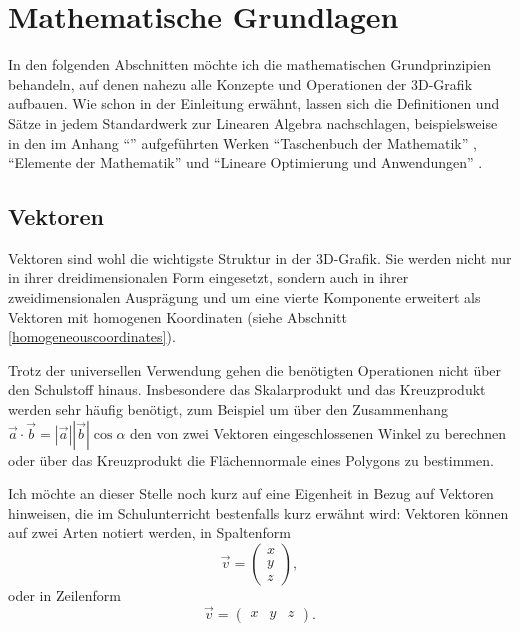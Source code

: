 \chapter{Mathematische Grundlagen}
\label{mathgrundlagen}
In den folgenden Abschnitten möchte ich die mathematischen Grundprinzipien behandeln, auf denen nahezu alle Konzepte und Operationen der 3D-Grafik aufbauen. Wie schon in der Einleitung erwähnt, lassen sich die Definitionen und Sätze in jedem Standardwerk zur Linearen Algebra nachschlagen, beispielsweise in den im Anhang \enquote{\bibname} aufgeführten Werken \enquote{Taschenbuch der Mathematik} \citep{bronstein}, \enquote{Elemente der Mathematik} \citep{elemente} und \enquote{Lineare Optimierung und Anwendungen} \citep{optimierung}.

\section{Vektoren}
Vektoren sind wohl die wichtigste Struktur in der 3D-Grafik. Sie werden nicht nur in ihrer dreidimensionalen Form eingesetzt, sondern auch in ihrer zweidimensionalen Ausprägung und um eine vierte Komponente erweitert als Vektoren mit homogenen Koordinaten (siehe Abschnitt \ref{homogeneouscoordinates}).

Trotz der universellen Verwendung gehen die benötigten Operationen nicht über den Schulstoff hinaus. Insbesondere das Skalarprodukt und das Kreuzprodukt werden sehr häufig benötigt, zum Beispiel um über den Zusammenhang
$\vec{a}\cdot\vec{b} = \left|\vec{a}\right|\left|\vec{b}\right|\cos\alpha$
den von zwei Vektoren eingeschlossenen Winkel zu berechnen oder über das Kreuzprodukt die Flächennormale eines Polygons zu bestimmen.

Ich möchte an dieser Stelle noch kurz auf eine Eigenheit in Bezug auf Vektoren hinweisen, die im Schulunterricht bestenfalls kurz erwähnt wird: Vektoren können auf zwei Arten notiert werden, in Spaltenform
\begin{equation*}
 \vec{v} = \begin{pmatrix} x \\ y \\ z \end{pmatrix},
\end{equation*}
oder in Zeilenform
\begin{equation*}
 \vec{v} = \begin{pmatrix} x & y & z \end{pmatrix}.
\end{equation*}

